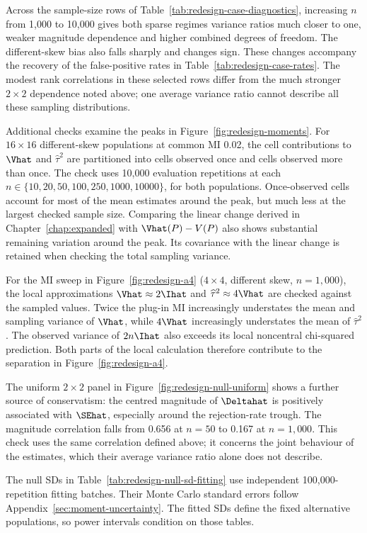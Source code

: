 Across the sample-size rows of Table~\ref{tab:redesign-case-diagnostics},
increasing \(n\) from 1,000 to 10,000 gives both sparse regimes variance
ratios much closer to one, weaker magnitude dependence and higher combined
degrees of freedom. The different-skew bias also falls sharply and changes
sign. These changes accompany the recovery of the false-positive rates
in Table~\ref{tab:redesign-case-rates}. The modest rank correlations in
these selected rows differ from the much stronger \(2\times2\)
dependence noted above; one average variance ratio cannot describe all
these sampling distributions.

Additional checks examine the peaks in Figure~\ref{fig:redesign-moments}.
For \(16\times16\) different-skew populations at common MI 0.02, the
cell contributions to \(\Vhat\) and \(\widehat\tau^2\) are partitioned
into cells observed once and cells observed more than once. The check uses
10,000 evaluation repetitions at each
\(n\in\{10,20,50,100,250,1000,10000\}\), for both populations.
Once-observed cells account for most of the mean estimates around the
peak, but much less at the largest checked sample size. Comparing the
linear change derived in Chapter~\ref{chap:expanded} with
\(\Vhat(P)-V(P)\) also shows substantial remaining variation around
the peak. Its covariance with the linear change is retained when
checking the total sampling variance.

For the MI sweep in Figure~\ref{fig:redesign-a4} (\(4\times4\),
different skew, \(n=1{,}000\)),
the local approximations \(\Vhat\approx2\Ihat\) and
\(\widehat\tau^2\approx4\Vhat\) are checked against the sampled
values. Twice the plug-in MI increasingly understates the mean and
sampling variance of \(\Vhat\), while \(4\Vhat\) increasingly
understates the mean of \(\widehat\tau^2\). The observed variance
of \(2n\Ihat\) also exceeds its local noncentral
chi-squared prediction. Both parts of the local calculation therefore
contribute to the separation in Figure~\ref{fig:redesign-a4}.

The uniform \(2\times2\) panel in Figure~\ref{fig:redesign-null-uniform}
shows a further source of
conservatism: the centred magnitude of \(\Deltahat\) is positively
associated with \(\SEhat\), especially around the rejection-rate
trough. The magnitude correlation falls from 0.656 at \(n=50\) to
0.167 at \(n=1{,}000\). This check uses the same correlation defined
above; it concerns the joint behaviour of the estimates, which their
average variance ratio alone does not describe.

\begin{samepage}
The null SDs in
Table~\ref{tab:redesign-null-sd-fitting} use independent 100,000-repetition
fitting batches. Their Monte Carlo standard errors follow
Appendix~\ref{sec:moment-uncertainty}. The fitted SDs define the fixed
alternative populations, so power intervals condition on those tables.
\par
\end{samepage}

